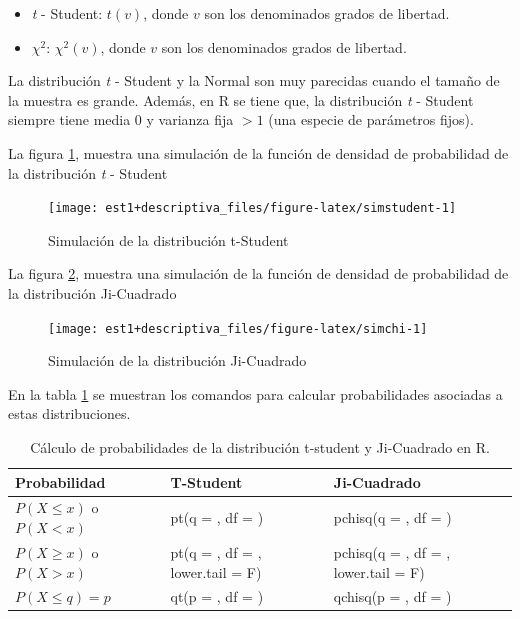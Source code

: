 \documentclass[
  11pt,
]{book}
\providecommand{\tightlist}{%
  \setlength{\itemsep}{0pt}\setlength{\parskip}{0pt}}
\newcommand{\gt}{>}
\newcommand{\lt}{<}
\theoremstyle{definition}
\theoremstyle{definition}
\theoremstyle{definition}
\theoremstyle{definition}
\theoremstyle{remark}
\begin{document}
\begin{itemize}
\tightlist
\item
  \emph{t} - Student: \(t(v)\), donde \(v\) son los denominados grados de libertad.
\item
  \(\chi^2\): \(\chi^2(v)\), donde \(v\) son los denominados grados de libertad.
\end{itemize}

La distribución \emph{t} - Student y la Normal son muy parecidas cuando el tamaño de la muestra es grande. Además, en R se tiene que, la distribución \emph{t} - Student siempre tiene media 0 y varianza fija \(> 1\) (una especie de parámetros fijos).

La figura \ref{fig:simstudent}, muestra una simulación de la función de densidad de probabilidad de la distribución \emph{t} - Student

\begin{figure}

{\centering \texttt{[image: est1+descriptiva\_files/figure-latex/simstudent-1]} 

}

\caption{Simulación de la distribución t-Student}\label{fig:simstudent}
\end{figure}

La figura \ref{fig:simchi}, muestra una simulación de la función de densidad de probabilidad de la distribución Ji-Cuadrado

\begin{figure}

{\centering \texttt{[image: est1+descriptiva\_files/figure-latex/simchi-1]} 

}

\caption{Simulación de la distribución Ji-Cuadrado}\label{fig:simchi}
\end{figure}

En la tabla \ref{tab:continuaRtchisq} se muestran los comandos para calcular probabilidades asociadas a estas distribuciones.

\begin{table}[H]
\centering
\caption{\label{tab:continuaRtchisq}Cálculo de probabilidades de la distribución t-student y Ji-Cuadrado en R.}
\centering
\begin{tabular}[t]{>{\raggedright\arraybackslash}p{3cm}>{\raggedright\arraybackslash}p{4cm}>{\raggedright\arraybackslash}p{4cm}}
\toprule
Probabilidad & T-Student & Ji-Cuadrado\\
\midrule
$P(X \leq x)$ o $P(X \lt x)$ & pt(q = , df = ) & pchisq(q = , df = )\\
$P(X \geq x)$ o $P(X \gt x)$ & pt(q = , df = , lower.tail = F) & pchisq(q = , df = , lower.tail = F)\\
$P(X \leq q) = p$ & qt(p = , df = ) & qchisq(p = , df = )\\
\bottomrule
\end{tabular}
\end{table}
\end{document}
